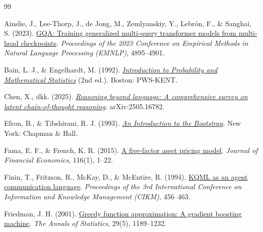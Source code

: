 \begin{thebibliography}{99}

Ainslie, J., Lee-Thorp, J., de Jong, M., Zemlyanskiy, Y., Lebr\'{o}n, F., \&
Sanghai, S. (2023).
\href{https://arxiv.org/abs/2305.13245}{GQA: Training generalized multi-query
transformer models from multi-head checkpoints}. \emph{Proceedings of the 2023
Conference on Empirical Methods in Natural Language Processing (EMNLP)},
4895--4901.

Bain, L. J., \& Engelhardt, M. (1992).
\href{https://archive.org/details/introductiontopr0000bain}{\emph{Introduction
to Probability and Mathematical Statistics}} (2nd ed.). Boston: PWS-KENT.

Chen, X., dkk. (2025).
\href{https://arxiv.org/abs/2505.16782}{\emph{Reasoning beyond language: A
comprehensive survey on latent chain-of-thought reasoning}}. arXiv:2505.16782.

Efron, B., \& Tibshirani, R. J. (1993).
\href{https://archive.org/details/introductiontobo0000efro}{\emph{An Introduction
to the Bootstrap}}. New York: Chapman \& Hall.

Fama, E. F., \& French, K. R. (2015).
\href{https://doi.org/10.1016/j.jfineco.2014.10.010}{A five-factor asset pricing
model}. \emph{Journal of Financial Economics}, 116(1), 1--22.

Finin, T., Fritzson, R., McKay, D., \& McEntire, R. (1994).
\href{https://doi.org/10.1145/191246.191322}{KQML as an agent communication
language}. \emph{Proceedings of the 3rd International Conference on Information
and Knowledge Management (CIKM)}, 456--463.

Friedman, J. H. (2001).
\href{https://doi.org/10.1214/aos/1013203451}{Greedy function approximation:
A gradient boosting machine}. \emph{The Annals of Statistics}, 29(5),
1189--1232.


\end{thebibliography}
